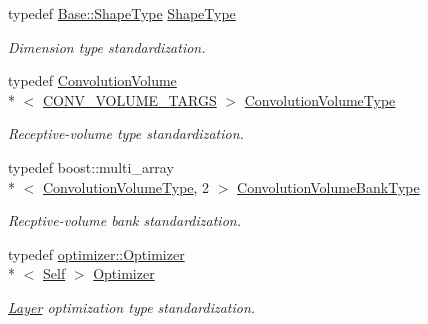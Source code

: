 \begin{DoxyCompactItemize}
typedef \hyperlink{classffnn_1_1layer_1_1_hidden_abdfcf81b3846fae3b19a207424695df0}{Base\-::\-Shape\-Type} \hyperlink{classffnn_1_1layer_1_1_convolution_af048fd677e8749bb295fac8d330ad843}{Shape\-Type}
\begin{DoxyCompactList}\small\item\em Dimension type standardization. \end{DoxyCompactList}\item 
typedef \hyperlink{classffnn_1_1layer_1_1_convolution_volume}{Convolution\-Volume}\\*
$<$ \hyperlink{convolution_8h_a054b25d3efc67e1baaedfbc7305f8f50}{C\-O\-N\-V\-\_\-\-V\-O\-L\-U\-M\-E\-\_\-\-T\-A\-R\-G\-S} $>$ \hyperlink{classffnn_1_1layer_1_1_convolution_afce446070a9d86d22f6b5b53fef7c7d0}{Convolution\-Volume\-Type}
\begin{DoxyCompactList}\small\item\em Receptive-\/volume type standardization. \end{DoxyCompactList}\item 
typedef boost\-::multi\-\_\-array\\*
$<$ \hyperlink{classffnn_1_1layer_1_1_convolution_afce446070a9d86d22f6b5b53fef7c7d0}{Convolution\-Volume\-Type}, 2 $>$ \hyperlink{classffnn_1_1layer_1_1_convolution_a9cec43e24f084c141c0cc8ae3c046ff4}{Convolution\-Volume\-Bank\-Type}
\begin{DoxyCompactList}\small\item\em Recptive-\/volume bank standardization. \end{DoxyCompactList}\item 
typedef \hyperlink{classffnn_1_1optimizer_1_1_optimizer}{optimizer\-::\-Optimizer}\\*
$<$ \hyperlink{classffnn_1_1layer_1_1_convolution_ae8b56bc2a6dbd4642a25210b1595f51c}{Self} $>$ \hyperlink{classffnn_1_1layer_1_1_convolution_a4f65a386b5e7803b1413b546215cefa3}{Optimizer}
\begin{DoxyCompactList}\small\item\em \hyperlink{classffnn_1_1layer_1_1_layer}{Layer} optimization type standardization. \end{DoxyCompactList}\end{DoxyCompactItemize}
